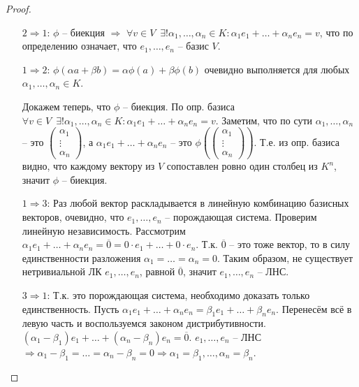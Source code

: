 \begin{proof} $ $

    \begin{itemize}
        \item[$2 \Rightarrow 1$:] $\phi$ -- биекция $\Rightarrow$
        $\forall v \in V \,\,\, \exists! \alpha_1, \dots, \alpha_n \in K :
        \alpha_1 e_1 + \dots + \alpha_n e_n = v$, что по определению
        означает, что $e_1, \dots, e_n$ -- базис $V$.

        \item[$1 \Rightarrow 2$:] $\phi(\alpha a + \beta b) = 
        \alpha \phi(a) + \beta \phi(b)$ очевидно выполняется
        для любых $\alpha_1, \dots, \alpha_n \in K$. 
        
        Докажем теперь, что $\phi$ -- биекция. По опр. базиса $\forall
        v \in V \,\,\, \exists! \alpha_1, \dots, \alpha_n \in K : 
        \alpha_1 e_1 + \dots + \alpha_n e_n = v$. Заметим, что по сути
        $\alpha_1, \dots, \alpha_n$ -- это $\begin{pmatrix}
            \alpha_1 \\ \vdots \\ \alpha_n
        \end{pmatrix}$, а $\alpha_1 e_1 + \dots + \alpha_n e_n$ -- это
        $\phi\left(\begin{pmatrix}
            \alpha_1 \\ \vdots \\ \alpha_n
        \end{pmatrix}\right)$. Т.е. из опр. базиса видно, что каждому 
        вектору из $V$ сопоставлен ровно один столбец из $K^n$, значит
        $\phi$ -- биекция.

        \item[$1 \Rightarrow 3$:] Раз любой вектор раскладывается
        в линейную комбинацию базисных векторов, очевидно,
        что $e_1, \dots, e_n$ -- порождающая система. Проверим линейную
        независимость. Рассмотрим $\alpha_1 e_1 + \dots + \alpha_n e_n
        = \overline{0} = 0 \cdot e_1 + \dots + 0 \cdot e_n$. Т.к.
        $\overline{0}$ -- это тоже вектор, то в силу единственности
        разложения $\alpha_1 = \dots = \alpha_n = 0$. Таким образом,
        не существует нетривиальной ЛК $e_1, \dots, e_n$, равной
        $\overline{0}$, значит $e_1, \dots, e_n$ -- ЛНС.

        \item[$3 \Rightarrow 1$:] Т.к. это порождающая система,
        необходимо доказать только единственность. 
        Пусть $\alpha_1 e_1 + \dots + \alpha_n e_n =
        \beta_1 e_1 + \dots + \beta_n e_n$. Перенесём всё в левую
        часть и воспользуемся законом дистрибутивности.
        $(\alpha_1 - \beta_1) e_1 + \dots + (\alpha_n - \beta_n) e_n =
        \overline{0}$. $e_1, \dots, e_n$ -- ЛНС $\Rightarrow
        \alpha_1 - \beta_1 = \dots = \alpha_n - \beta_n = 0 \Rightarrow
        \alpha_1 = \beta_1, \dots, \alpha_n = \beta_n$.


\end{itemize}
\end{proof}
